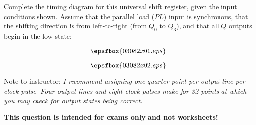 

Complete the timing diagram for this universal shift register, given the input conditions shown.  Assume that the parallel load ($\overline{PL}$) input is synchronous, that the shifting direction is from left-to-right (from $Q_0$ to $Q_3$), and that all $Q$ outputs begin in the low state:

$$\epsfbox{03082x01.eps}$$







$$\epsfbox{03082x02.eps}$$

Note to instructor: {\it I recommend assigning one-quarter point per output line per clock pulse.  Four output lines and eight clock pulses make for 32 points at which you may check for output states being correct.}







{\bf This question is intended for exams only and not worksheets!}.




